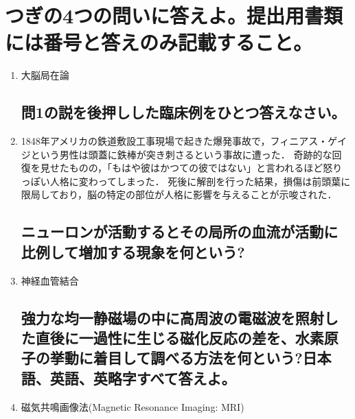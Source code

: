 \documentclass[titlepage,a4paper]{jsarticle}
\begin{document}
\section{つぎの4つの問いに答えよ。提出用書類には番号と答えのみ記載すること。}%
\begin{enumerate}
      \subsection{「ヒトの高度な精神活動のそれぞれの機能系にはある程度の機能局在がある」という考え方を何という?}
      \item 大脳局在論
            \subsection{問1の説を後押しした臨床例をひとつ答えなさい。}
      \item 1848年アメリカの鉄道敷設工事現場で起きた爆発事故で，フィニアス・ゲイジという男性は頭蓋に鉄棒が突き刺さるという事故に遭った．
            奇跡的な回復を見せたものの，「もはや彼はかつての彼ではない」と言われるほど怒りっぽい人格に変わってしまった．
            死後に解剖を行った結果，損傷は前頭葉に限局しており，脳の特定の部位が人格に影響を与えることが示唆された．
            \subsection{ニューロンが活動するとその局所の血流が活動に比例して増加する現象を何という?}
      \item 神経血管結合
            \subsection{強力な均一静磁場の中に高周波の電磁波を照射した直後に一過性に生じる磁化反応の差を、水素原子の挙動に着目して調べる方法を何という?日本語、英語、英略字すべて答えよ。}
      \item 磁気共鳴画像法(Magnetic Resonance Imaging: MRI)
\end{enumerate}
\end{document}
